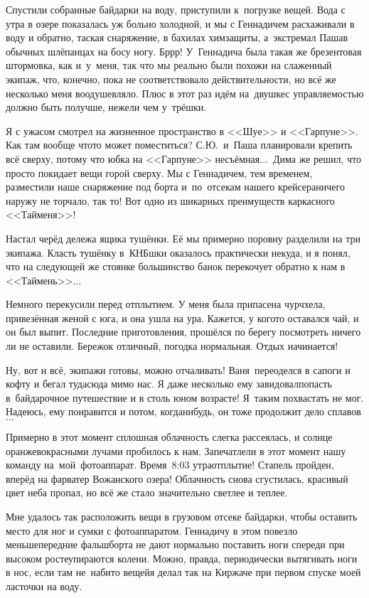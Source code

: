 Спустили собранные байдарки на воду, приступили к~погрузке вещей. Вода с утра в озере показалась уж больно холодной, и мы с Геннадичем расхаживали в воду и обратно, таская снаряжение, в бахилах химзащиты, а~экстремал Паша\mdash в обычных шлёпанцах на босу ногу. Бр\sdash р\sdash р! У~Геннадича была такая же брезентовая штормовка, как и~у~меня, так что мы реально были похожи на слаженный экипаж, что, конечно, пока не соответствовало действительности, но всё же несколько меня воодушевляло. Плюс в этот раз идём на~двушке\mdash с управляемостью должно быть получше, нежели чем у~трёшки.

Я с ужасом смотрел на жизненное пространство в <<Шуе>> и <<Гарпуне>>. Как там вообще что\sdash то может поместиться? С.Ю.~и~Паша планировали крепить всё сверху, потому что юбка на <<Гарпуне>> несъёмная$\ldots$~Дима же решил, что просто покидает вещи горой сверху. Мы с Геннадичем, тем временем, разместили наше снаряжение под борта и~по~отсекам нашего крейсера\mdash ничего наружу не торчало, так то! Вот одно из шикарных преимуществ каркасного <<Тайменя>>!

Настал черёд дележа ящика тушёнки. Её мы примерно поровну разделили на три экипажа. Класть тушёнку в~КНБ\sdash шки оказалось практически некуда, и я понял, что на следующей же стоянке большинство банок перекочует обратно к нам в <<Таймень>>$\ldots$

Немного перекусили перед отплытием. У меня была припасена чурчхела, привезённая женой с юга, и она ушла на ура. Кажется, у кого\sdash то оставался чай, и он был выпит. Последние приготовления, прошёлся по берегу посмотреть ничего ли не оставили. Бережок отличный, погодка нормальная. Отдых начинается!

Ну, вот и всё, экипажи готовы, можно отчаливать! Ваня~переоделся в сапоги и кофту и бегал туда\sdash сюда мимо нас. Я даже несколько ему завидовал\mdash попасть в~байдарочное путешествие и в столь юном возрасте! Я~таким похвастать не мог. Надеюсь, ему понравится и потом, когда\sdash нибудь, он тоже продолжит дело сплавов$\ldots$

Примерно в этот момент сплошная облачность слегка рассеялась, и солнце оранжево\sdash красными лучами пробилось к нам. Запечатлели в этот момент нашу команду на~мой~фотоаппарат. Время~8:03 утра\mdash отплытие! Стапель пройден, вперёд на фарватер Вожанского  озера! Облачность снова сгустилась, красивый цвет неба пропал, но всё же стало значительно светлее и теплее.

Мне удалось так расположить вещи в грузовом отсеке байдарки, чтобы оставить место для ног и сумки с фотоаппаратом. Геннадичу в этом повезло меньше\mdash передние фальшборта не дают нормально поставить ноги спереди при высоком росте\mdash упираются колени. Можно, правда, периодически вытягивать ноги в нос, если там не~набито вещей\mdash я делал так на Киржаче при первом спуске моей ласточки на воду.  

